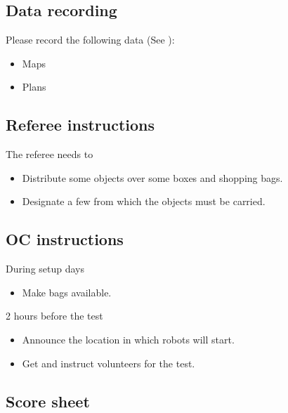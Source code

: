 \subsection{Data recording}
  Please record the following data (See ):
\begin{itemize}
 \item Maps
 \item Plans
\end{itemize}

\subsection{Referee instructions}

The referee needs to
\begin{itemize}
  \item Distribute some objects over some boxes and shopping bags.
  \item Designate a few  from which the objects must be carried.
\end{itemize}

\subsection{OC instructions}

During setup days
\begin{itemize}
  \item Make bags available.
\end{itemize}

2 hours before the test
\begin{itemize}
  \item Announce the location in which robots will start.
  \item Get and instruct volunteers for the test.
\end{itemize}

\newpage
\subsection{Score sheet}
